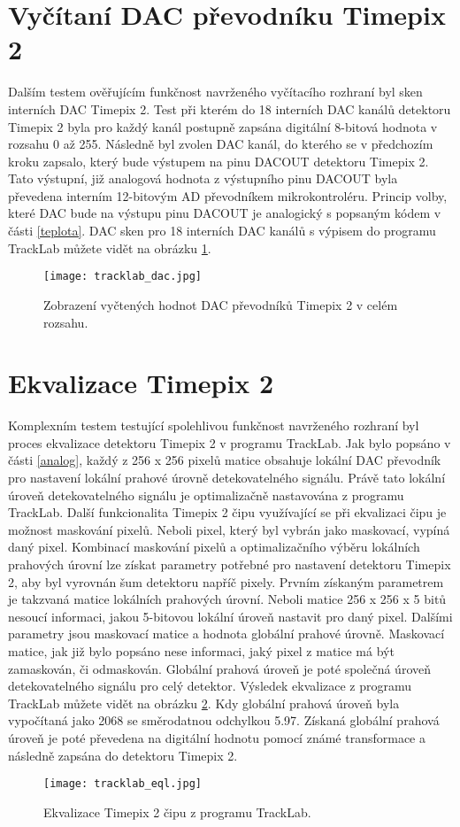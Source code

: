 \section{Vyčítaní DAC převodníku Timepix 2}
	Dalším testem ověřujícím funkčnost navrženého vyčítacího rozhraní byl sken interních DAC Timepix 2. Test při kterém do 18 interních DAC kanálů detektoru Timepix 2 byla pro každý kanál postupně zapsána digitální 8-bitová hodnota v rozsahu 0 až 255. Následně byl zvolen DAC kanál, do kterého se v předchozím kroku zapsalo, který bude výstupem na pinu DACOUT detektoru Timepix 2. Tato výstupní, již analogová hodnota z výstupního pinu DACOUT byla převedena interním 12-bitovým AD převodníkem mikrokontroléru. Princip volby, které DAC bude na výstupu pinu DACOUT je analogický s popsaným kódem v části \ref{teplota}. DAC sken pro 18 interních DAC kanálů s výpisem do programu TrackLab můžete vidět na obrázku \ref{fig:dacscan}. 
	\begin{figure}[h!]
		\centering
		\captionsetup{justification=centering}
		\texttt{[image: tracklab\_dac.jpg]}
		\caption{Zobrazení vyčtených hodnot DAC převodníků Timepix 2 v celém rozsahu.} 
		\label{fig:dacscan}
	\end{figure}

\section{Ekvalizace Timepix 2}
	Komplexním testem testující spolehlivou funkčnost navrženého rozhraní byl proces ekvalizace detektoru Timepix 2 v programu TrackLab. Jak bylo popsáno v části \ref{analog}, každý z 256 x 256 pixelů matice obsahuje lokální DAC převodník pro nastavení lokální prahové úrovně detekovatelného signálu. Právě tato lokální úroveň detekovatelného signálu je optimalizačně nastavována z programu TrackLab. Další funkcionalita Timepix 2 čipu využívající se při ekvalizaci čipu je možnost maskování pixelů. Neboli pixel, který byl vybrán jako maskovací, vypíná daný pixel. Kombinací maskování pixelů a optimalizačního výběru lokálních prahových úrovní lze získat parametry potřebné pro nastavení detektoru Timepix 2, aby byl vyrovnán šum detektoru napříč pixely. Prvním získaným parametrem je takzvaná matice lokálních prahových úrovní. Neboli matice 256 x 256 x 5 bitů nesoucí informaci, jakou 5-bitovou lokální úroveň nastavit pro daný pixel. Dalšími parametry jsou maskovací matice a hodnota globální prahové úrovně. Maskovací matice, jak již bylo popsáno nese informaci, jaký pixel z matice má být zamaskován, či odmaskován. Globální prahová úroveň je poté společná úroveň detekovatelného signálu pro celý detektor. Výsledek ekvalizace z programu TrackLab můžete vidět na obrázku \ref{fig:tracklab_eql}. Kdy globální prahová úroveň byla vypočítaná jako 2068 se směrodatnou odchylkou 5.97. Získaná globální prahová úroveň je poté převedena na digitální hodnotu pomocí známé transformace a následně zapsána do detektoru Timepix 2.
	\begin{figure}[h!]
		\centering
		\captionsetup{justification=centering}
		\texttt{[image: tracklab\_eql.jpg]}
		\caption{Ekvalizace Timepix 2 čipu z programu TrackLab.} 
		\label{fig:tracklab_eql}
	\end{figure}

